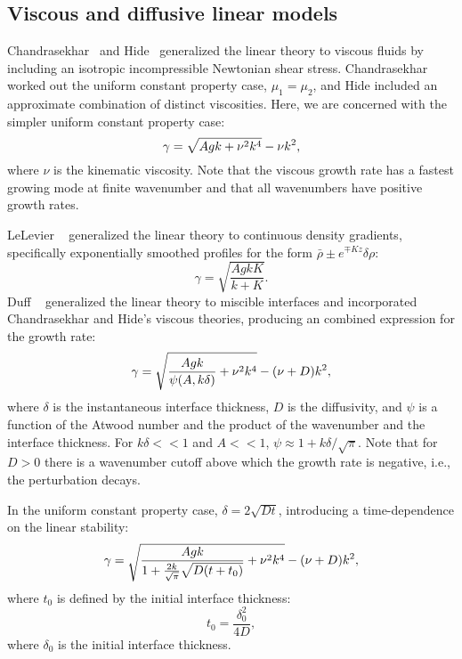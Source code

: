 \subsection{Viscous and diffusive linear models}
Chandrasekhar~\cite{Chandrasekhar1955} and Hide~\cite{Hide1955} generalized the linear theory to viscous fluids by including an isotropic incompressible Newtonian shear stress.
Chandrasekhar worked out the uniform constant property case, $\mu_1 = \mu_2$, and Hide included an approximate combination of distinct viscosities.
Here, we are concerned with the simpler uniform constant property case:
\begin{equation} \elabel{visc_growth}
  \gamma = \sqrt{A g k + \nu^2 k^4} - \nu k^2,
\end{equation} 
where 
$\nu$ is the kinematic viscosity.
Note that the viscous growth rate has a fastest growing mode at finite wavenumber and that all wavenumbers have positive growth rates.

LeLevier \etal~\cite{LeLevier1955} generalized the linear theory to continuous density gradients, specifically exponentially smoothed profiles for the form $\bar\rho \pm e^{\mp K z} \delta\rho$:
\begin{equation}
\gamma = \sqrt{\frac{A g k K}{k + K}}.
\end{equation}
Duff \etal~\cite{Duff1962} generalized the linear theory to miscible interfaces and incorporated Chandrasekhar and Hide's viscous theories, producing an combined expression for the growth rate:
\begin{equation} \elabel{duff_simple}
\gamma = \sqrt{\frac{A g k}{\psi(A,k\delta)} + \nu^2 k^4} - (\nu + D) k^2,
\end{equation}
where 
$\delta$ is the instantaneous interface thickness,
$D$ is the diffusivity,
and $\psi$ is a function of the Atwood number and the product of the wavenumber and the interface thickness.
For $k \delta << 1$ and $A << 1$, $\psi \approx 1 + k \delta / \sqrt{\pi}$.
Note that for $D > 0$ there is a wavenumber cutoff above which the growth rate is negative, i.e., the perturbation decays.

In the uniform constant property case, $\delta = 2 \sqrt{D t}$, introducing a time-dependence on the linear stability:
\begin{equation} \elabel{duff_growth}
\gamma = \sqrt{\frac{A g k}{1 + \frac{2 k}{\sqrt{\pi}}\sqrt{D (t+t_0)} } + \nu^2 k^4} - (\nu + D) k^2,
\end{equation}
where $t_0$ is defined by the initial interface thickness:
\begin{equation}
t_0 = \frac{\delta_0^2}{4 D},
\end{equation}
where $\delta_0$ is the initial interface thickness.

